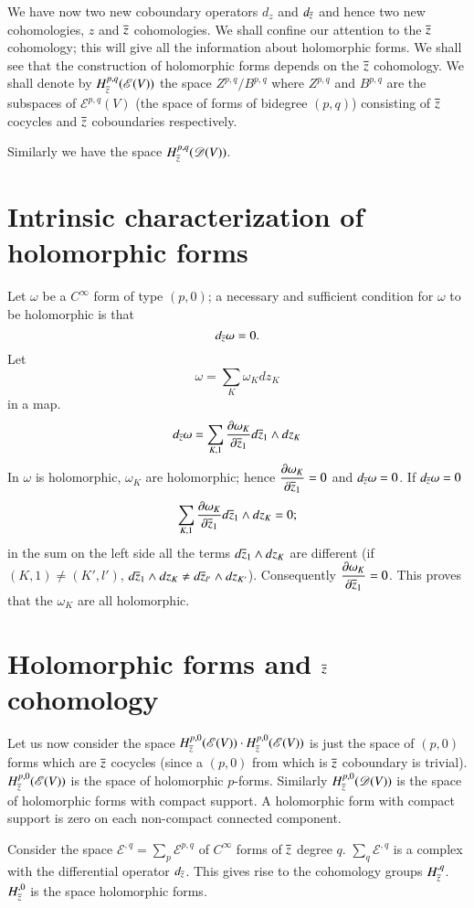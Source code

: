 We have now two new coboundary operators $d_{z}$ and $d_{\overline{z}}$ and
hence two new cohomologies, $z$ and $\overline{z}$ cohomologies. We shall
confine our attention to the $\overline{z}$ cohomology; this will give all
the information about holomorphic forms. We shall see that the
construction of holomorphic forms depends on the $\overline{z}$
cohomology. We shall denote by $H^{p,q}_{\overline{z}}(\mathscr{E}(V))$ the
space $Z^{p,q}/B^{p,q}$ where $Z^{p,q}$ and $B^{p,q}$ are the
subspaces of $\mathscr{E}^{p,q}(V)$ (the space of forms of bidegree
$(p,q)$) consisting of $\overline{z}$ cocycles and $\overline{z}$ coboundaries
respectively. 

Similarly we have the space $H^{p,q}_{\overline{z}}(\mathscr{D}(V))$.

\section*{Intrinsic characterization of holomorphic forms}

Let $\omega$ be a $C^{\infty}$ form of type $(p,0)$; a necessary and
sufficient condition for $\omega$ to be holomorphic is that
$$
d_{\overline{z}}\omega=0.
$$
Let
$$
\omega=\sum_{K}\omega_{K}dz_{K}
$$
in a map.
$$
d_{\overline{z}}\omega=\sum_{K,1}\frac{\partial \omega_{K}}{\partial
  \overline{z}_{1}}d\overline{z}_{1}\wedge dz_{K} 
$$
In $\omega$ is holomorphic, $\omega_{K}$ are holomorphic; hence
$\dfrac{\partial \omega_{K}}{\partial \overline{z}_{1}}=0$ and
$d_{\overline{z}}\omega=0$. If $d_{\overline{z}}\omega=0$
$$
\sum_{K,1}\frac{\partial \omega_{K}}{\partial
  \overline{z}_{1}}d\overline{z}_{1}\wedge dz_{K}=0;
$$\pageoriginale
in the sum on the left side all the terms $d\overline{z}_{1}\wedge dz_{K}$
are different (\iec if $(K,1)\neq (K',l')$, $d\overline{z}_{1}\wedge
dz_{K}\neq d\overline{z}_{l'}\wedge dz_{K'}$). Consequently $\dfrac{\partial
  \omega_{K}}{\partial \overline{z}_{1}}=0$. This proves that the
$\omega_{K}$ are all holomorphic.

\section*{Holomorphic forms and $\overline{z}$ cohomology}

Let us now consider the space $H^{p,0}_{\overline{z}}(\mathscr{E}(V))\cdot
H^{p,0}_{\overline{z}}(\mathscr{E}(V))$ is just the space of $(p,0)$ forms
which are $\overline{z}$ cocycles (since a $(p,0)$ from which is $\overline{z}$
coboundary is trivial). \iec $H^{p,0}_{\overline{z}}(\mathscr{E}(V))$ is the
space of holomorphic $p$-forms. Similarly
$H^{p,0}_{\overline{z}}(\mathscr{D}(V))$ is the space of holomorphic forms
with compact support. A holomorphic form with compact support is zero
on each non-compact connected component.

Consider the space $\mathscr{E}^{,q}=\sum\limits_{p}\mathscr{E}^{p,q}$
of $C^{\infty}$ forms of $\overline{z}$ degree
$q$. $\sum\limits_{q}\mathscr{E}^{,q}$ is a complex with the
differential operator $d_{\overline{z}}$. This gives rise to the cohomology
groups $H_{\overline{z}}^{,q}$. $H^{,0}_{\overline{z}}$ is the space holomorphic
forms.



